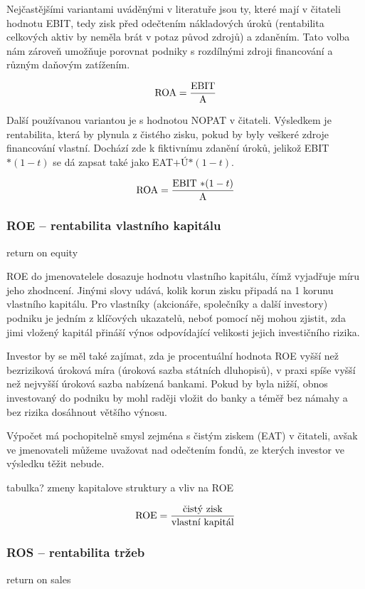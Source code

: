 Nejčastějšími variantami uváděnými v literatuře jsou ty, které mají v čitateli hodnotu EBIT, tedy zisk před odečtením nákladových úroků (rentabilita celkových aktiv by neměla brát v potaz původ zdrojů) a zdaněním. Tato volba nám zároveň umožňuje porovnat podniky s rozdílnými zdroji financování a různým daňovým zatížením.

$$\text{ROA} = \dfrac{\text{EBIT}}{\text{A}}$$

Další používanou variantou je s hodnotou NOPAT v čitateli. Výsledkem je rentabilita, která by plynula z čistého zisku, pokud by byly veškeré zdroje financování vlastní. Dochází zde k fiktivnímu zdanění úroků, jelikož EBIT$*(1-t)$ se dá zapsat také jako EAT$+$Ú$*(1-t)$.

$$\text{ROA} = \dfrac{\text{EBIT $*(1-t)$}}{\text{A}}$$ 


\subsubsection{ROE -- rentabilita vlastního kapitálu}
return on equity

ROE do jmenovatelele dosazuje hodnotu vlastního kapitálu, čímž vyjadřuje míru jeho zhodncení. Jinými slovy udává, kolik korun zisku připadá na 1 korunu vlastního kapitálu. Pro vlastníky (akcionáře, společníky a další investory) podniku je jedním z klíčových ukazatelů, neboť pomocí něj mohou zjistit, zda jimi vložený kapitál přináší výnos odpovídající velikosti jejich investičního rizika\cite{sedl}.

Investor by se měl také zajímat, zda je procentuální hodnota ROE vyšší než bezriziková úroková míra (úroková sazba státních dluhopisů), v praxi spíše vyšší než nejvyšší úroková sazba nabízená bankami. Pokud by byla nižší, obnos investovaný do podniku by mohl raději vložit do banky a téměř bez námahy a bez rizika dosáhnout většího výnosu.

Výpočet má pochopitelně smysl zejména s čistým ziskem (EAT) v čitateli, avšak ve jmenovateli můžeme uvažovat nad odečtením fondů, ze kterých investor ve výsledku těžit nebude.

tabulka? zmeny kapitalove struktury a vliv na ROE

$$\text{ROE} = \dfrac{\text{čistý zisk}}{\text{vlastní kapitál}}$$ 


\subsubsection{ROS -- rentabilita tržeb}
return on sales

